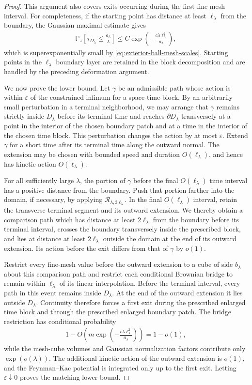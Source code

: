 \documentclass[a4paper,10pt]{article}
\numberwithin{equation}{section}
\theoremstyle{plain}
\theoremstyle{plain}
\theoremstyle{plain}
\theoremstyle{plain}
\theoremstyle{plain}
\theoremstyle{remark}
\theoremstyle{definition}
\newcommand{\PP}{\mathbb{P}}
\newcommand{\eq}[1]{\begin{align*}#1\end{align*}}
\begin{document}
\begin{proof}
This argument also covers exits occurring during the first fine mesh
interval. For completeness, if the starting point has distance at
least $\ell_\lambda$ from the boundary, the Gaussian maximal estimate
gives
\eq{
\PP_z\left[
\tau_{D_\lambda}
\leq
\frac{a_\lambda}{\lambda}
\right]
\leq
C
\exp\left(
-\frac{
c\lambda\ell_\lambda^2
}{
a_\lambda
}
\right),
}
which is superexponentially small by
\cref{eq:exterior-ball-mesh-scales}. Starting points in the
$\ell_\lambda$ boundary layer are retained in the block decomposition
and are handled by the preceding deformation argument.

We now prove the lower bound. Let $\gamma$ be an admissible path whose
action is within $\varepsilon$ of the constrained infimum for a
space-time block. By an arbitrarily small perturbation in a terminal
neighborhood, we may arrange that $\gamma$ remains strictly inside
$D_\lambda$ before its terminal time and reaches
$\partial D_\lambda$ transversely at a point in the interior of the
chosen boundary patch and at a time in the interior of the chosen
time block. This perturbation changes the action by at most
$\varepsilon$. Extend $\gamma$ for a short time after its terminal
time along the outward normal. The extension may be chosen with
bounded speed and duration $O(\ell_\lambda)$, and hence has kinetic
action $O(\ell_\lambda)$.

For all sufficiently large $\lambda$, the portion of $\gamma$ before
the final $O(\ell_\lambda)$ time interval has a positive distance
from the boundary. Push that portion farther into the domain, if
necessary, by applying
$\mathcal R_{\lambda,3\ell_\lambda}$. In the final
$O(\ell_\lambda)$ interval, retain the transverse terminal segment
and its outward extension. We thereby obtain a comparison path which
has distance at least $2\ell_\lambda$ from the boundary before its
terminal interval, crosses the boundary transversely inside the
prescribed block, and lies at distance at least
$2\ell_\lambda$ outside the domain at the end of its outward
extension. Its action before the exit differs from that of $\gamma$
by $o(1)$.

Restrict every fine-mesh value before the outward extension to a cube
of side $b_\lambda$ about this comparison path and restrict each
conditional Brownian bridge to remain within $\ell_\lambda$ of its
linear interpolation. Before the terminal interval, every path in
this event remains inside $D_\lambda$. At the end of the outward
extension it lies outside $D_\lambda$. Continuity therefore forces a
first exit during the prescribed enlarged time block and through the
prescribed enlarged boundary patch. The bridge restriction has
conditional probability
\eq{
1-
O\left(
m
\exp\left(
-\frac{
c\lambda\ell_\lambda^2
}{
a_\lambda
}
\right)
\right)
=
1-o(1),
}
while the mesh-cube volumes and Gaussian normalization factors
contribute only $\exp(o(\lambda))$. The additional kinetic action of
the outward extension is $o(1)$, and the Feynman--Kac potential is
integrated only up to the first exit. Letting
$\varepsilon\downarrow0$ proves the matching lower bound.


\end{proof}
\end{document}

